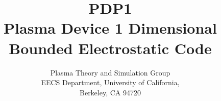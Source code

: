 
\topmargin 0.00in
\oddsidemargin 0.25in
\textheight 9.00in
\textwidth 6.00in
\pagestyle{plain}
\renewcommand{\baselinestretch}{1.4}


\title{
PDP1\\ Plasma Device 1 Dimensional Bounded Electrostatic Code
}
\author{
Plasma Theory and Simulation Group\\
EECS Department,
University of California,\\ Berkeley, CA 94720}

\date{}

%
\begin{figure}
\begin{center}
\leavevmode
\hbox{%
\epsfysize 4.0in
\epsfxsize 4.0in
}
\end{center}
\end{figure}
%
\maketitle
\newpage
\tableofcontents
\newpage

